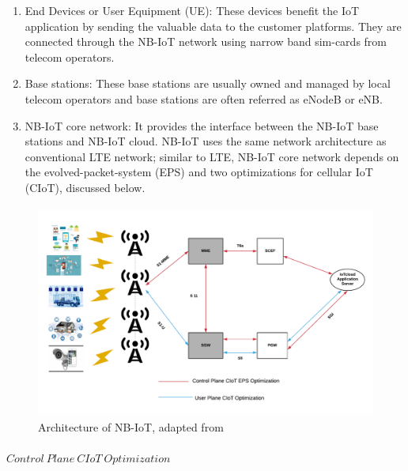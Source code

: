 \documentclass[12pt]{article}
\begin{document}
\renewcommand{\labelenumi}{\roman{enumi}}
\begin{enumerate}

    \item End Devices or User Equipment (UE): These devices benefit the IoT application by sending the valuable data to the customer platforms. They are connected through the NB-IoT network using narrow band sim-cards from telecom operators.
    \item Base stations: These base stations are usually owned and managed by local telecom operators and base stations are often referred as eNodeB or eNB.
    \item NB-IoT core network: It provides the interface between the NB-IoT base stations and NB-IoT cloud. NB-IoT uses the same network architecture as conventional LTE network; similar to LTE, NB-IoT core network depends on the evolved-packet-system (EPS) and two optimizations for cellular IoT (CIoT), discussed below.
\end{enumerate}
\begin{figure}[H]
    \centering
    \includegraphics[width=\columnwidth, height=7cm, keepaspectratio]{Images/nb-iotArchitecture.pdf}
    \caption{Architecture of NB-IoT, adapted from \cite{jaber2019study}}
    \label{fig:NB-IoT Architecture}
\end{figure}

\paragraph{$Control\ Plane\ CIoT\ Optimization$}
\end{document}
